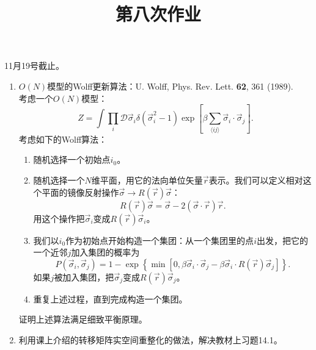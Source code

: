 \documentclass[12pt,aps,pra,notitlepage]{revtex4-1}
\begin{document}
\title{第八次作业}
\maketitle
\begin{center}
  11月19号截止。
\end{center}
\begin{enumerate}
  \item $O(N)$模型的Wolff更新算法：U. Wolff, Phys. Rev. Lett. \textbf{62}, 361 (1989).\\
  考虑一个$O(N)$模型：
  \[Z=\int\prod_i\mathcal{D}\vec{\sigma}_i\delta(\vec\sigma_i^2-1)\exp\left[\beta\sum_{\langle ij\rangle}\vec\sigma_i\cdot\vec\sigma_j\right].\]
  考虑如下的Wolff算法：
  \begin{enumerate}
    \item 随机选择一个初始点$i_0$。
    \item 随机选择一个$N$维平面，用它的法向单位矢量$\vec r$表示。我们可以定义相对这个平面的镜像反射操作$\vec\sigma\rightarrow R(\vec r)\vec\sigma$：
    \[R(\vec r)\vec\sigma = \vec\sigma - 2(\vec\sigma\cdot\vec r)\vec r.\]
    用这个操作把$\vec\sigma_i$变成$R(\vec r)\vec\sigma_i$。
    \item 我们以$i_0$作为初始点开始构造一个集团：从一个集团里的点$i$出发，把它的一个近邻$j$加入集团的概率为
    \[P(\vec\sigma_i,\vec\sigma_j) = 1-\exp\left\{\min\left[0, \beta\vec\sigma_i\cdot\vec\sigma_j-\beta\vec\sigma_i\cdot R(\vec r)\vec\sigma_j\right]\right\}.\]
    如果$j$被加入集团，把$\vec\sigma_j$变成$R(\vec r)\vec\sigma_j$。
    \item 重复上述过程，直到完成构造一个集团。
  \end{enumerate}
  证明上述算法满足细致平衡原理。

  \item 利用课上介绍的转移矩阵实空间重整化的做法，解决教材上习题14.1。
\end{enumerate}
\end{document}
